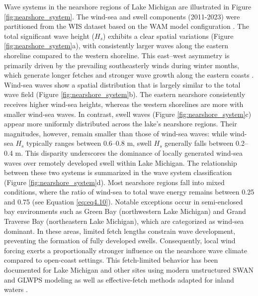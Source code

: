 Wave systems in the nearshore regions of Lake Michigan are illustrated in Figure
\ref{fig:nearshore_system}. The wind-sea and swell components (2011-2023) were
partitioned from the WIS dataset based on the WAM model configuration
\citep{jensen_lake_2012}. The total significant wave height ($H_s$) exhibits a
clear spatial variations (Figure \ref{fig:nearshore_system}a), with consistently
larger waves along the eastern shoreline compared to the western shoreline. This
east–west asymmetry is primarily driven by the prevailing southeasterly winds
during winter months, which generate longer fetches and stronger wave growth
along the eastern coasts \citep{huang_wave_2021,abdelhady_shoreline_2025}.
Wind-sea waves show a spatial distribution that is largely similar to the total
wave field (Figure \ref{fig:nearshore_system}b). The eastern nearshore
consistently receives higher wind-sea heights, whereas the western shorelines
are more with smaller wind-sea waves. In contrast, swell waves (Figure
\ref{fig:nearshore_system}c) appear more uniformly distributed across the lake’s
nearshore regions. Their magnitudes, however, remain smaller than those of
wind-sea waves: while wind-sea $H_s$ typically ranges between 0.6–0.8 m, swell
$H_s$ generally falls between 0.2–0.4 m. This disparity underscores the
dominance of locally generated wind-sea waves over remotely developed swell
within Lake Michigan. The relationship between these two systems is summarized
in the wave system classification (Figure \ref{fig:nearshore_system}d). Most
nearshore regions fall into mixed conditions, where the ratio of wind-sea to
total wave energy remains between 0.25 and 0.75 (see Equation \ref{eq:eq4.10}).
Notable exceptions occur in semi-enclosed bay environments such as Green Bay
(northwestern Lake Michigan) and Grand Traverse Bay (northeastern Lake
Michigan), which are categorized as wind-sea dominant. In these areas, limited
fetch lengths constrain wave development, preventing the formation of fully
developed swells. Consequently, local wind forcing exerts a proportionally
stronger influence on the nearshore wave climate compared to open-coast
settings. This fetch-limited behavior has been documented for Lake Michigan and
other sites using modern unstructured SWAN and GLWPS modeling as well as
effective-fetch methods adapted for inland waters
\citep[\eg][]{mao_modeling_2016,alves2023noaa,rohweder2008application}. 

